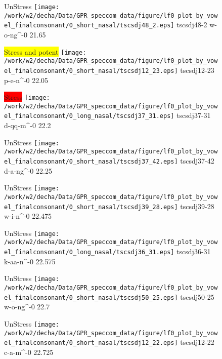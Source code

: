 \documentclass{article}
\begin{document}
\begin{figure}[t]
\begin{minipage}[b]{.24\textwidth}
UnStress
\centering
\texttt{[image: /work/w2/decha/Data/GPR\_speccom\_data/figure/lf0\_plot\_by\_vowel\_finalconsonant/0\_short\_nasal/tscsdj48\_2.eps]}
tscsdj48-2 w-o-ng\textasciicircum-0 21.65
\end{minipage}
\begin{minipage}[b]{.24\textwidth}
\colorbox{yellow}{Stress and potent}
\centering
\texttt{[image: /work/w2/decha/Data/GPR\_speccom\_data/figure/lf0\_plot\_by\_vowel\_finalconsonant/0\_short\_nasal/tscsdj12\_23.eps]}
tscsdj12-23 p-e-n\textasciicircum-0 22.05
\end{minipage}
\begin{minipage}[b]{.24\textwidth}
\colorbox{red}{Stress}
\centering
\texttt{[image: /work/w2/decha/Data/GPR\_speccom\_data/figure/lf0\_plot\_by\_vowel\_finalconsonant/0\_long\_nasal/tscsdj37\_31.eps]}
tscsdj37-31 d-qq-m\textasciicircum-0 22.2
\end{minipage}
\begin{minipage}[b]{.24\textwidth}
UnStress
\centering
\texttt{[image: /work/w2/decha/Data/GPR\_speccom\_data/figure/lf0\_plot\_by\_vowel\_finalconsonant/0\_short\_nasal/tscsdj37\_42.eps]}
tscsdj37-42 d-a-ng\textasciicircum-0 22.25
\end{minipage}
\end{figure}

\begin{figure}[t]
\begin{minipage}[b]{.24\textwidth}
UnStress
\centering
\texttt{[image: /work/w2/decha/Data/GPR\_speccom\_data/figure/lf0\_plot\_by\_vowel\_finalconsonant/0\_short\_nasal/tscsdj39\_28.eps]}
tscsdj39-28 w-i-n\textasciicircum-0 22.475
\end{minipage}
\begin{minipage}[b]{.24\textwidth}
UnStress
\centering
\texttt{[image: /work/w2/decha/Data/GPR\_speccom\_data/figure/lf0\_plot\_by\_vowel\_finalconsonant/0\_long\_nasal/tscsdj36\_31.eps]}
tscsdj36-31 k-aa-n\textasciicircum-0 22.575
\end{minipage}
\begin{minipage}[b]{.24\textwidth}
UnStress
\centering
\texttt{[image: /work/w2/decha/Data/GPR\_speccom\_data/figure/lf0\_plot\_by\_vowel\_finalconsonant/0\_short\_nasal/tscsdj50\_25.eps]}
tscsdj50-25 w-o-ng\textasciicircum-0 22.7
\end{minipage}
\begin{minipage}[b]{.24\textwidth}
UnStress
\centering
\texttt{[image: /work/w2/decha/Data/GPR\_speccom\_data/figure/lf0\_plot\_by\_vowel\_finalconsonant/0\_short\_nasal/tscsdj12\_22.eps]}
tscsdj12-22 c-a-m\textasciicircum-0 22.725
\end{minipage}
\end{figure}
\end{document}
